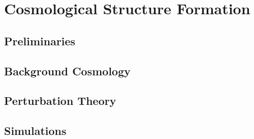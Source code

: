 %
%

\part{Cosmological Structure Formation}\label{part:cosmological_structure_formation}

\chapter{Preliminaries}\label{ch:cosmological_structure_formation:preliminaries}


\chapter{Background Cosmology}\label{ch:cosmological_structure_formation:background}


\chapter{Perturbation Theory}\label{ch:cosmological_structure_formation:perturbation_theory}


\chapter{Simulations}\label{ch:cosmological_structure_formation:simulations}
